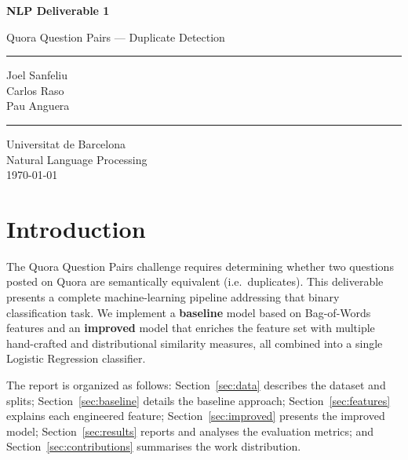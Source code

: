 \documentclass[11pt,a4paper]{article}
\begin{document}
\begin{titlepage}
    \centering
    \vspace*{2cm}
    {\LARGE\bfseries\color{accentblue} NLP Deliverable 1\par}
    \vspace{0.4cm}
    {\large Quora Question Pairs --- Duplicate Detection\par}
    \vspace{1.5cm}
    \rule{0.6\textwidth}{0.8pt}\par
    \vspace{1cm}
    {\large
        Joel Sanfeliu\\[4pt]
        Carlos Raso\\[4pt]
        Pau Anguera\par}
    \vspace{1cm}
    \rule{0.6\textwidth}{0.8pt}\par
    \vspace{1.5cm}
    {\normalsize Universitat de Barcelona\\
    Natural Language Processing\\
    \today\par}
    \vfill
\end{titlepage}

\tableofcontents
\newpage

\section{Introduction}

The Quora Question Pairs challenge requires determining whether two questions posted on Quora are semantically equivalent (i.e.\ duplicates). This deliverable presents a complete machine-learning pipeline addressing that binary classification task. We implement a \textbf{baseline} model based on Bag-of-Words features and an \textbf{improved} model that enriches the feature set with multiple hand-crafted and distributional similarity measures, all combined into a single Logistic Regression classifier.

The report is organized as follows: Section~\ref{sec:data} describes the dataset and splits; Section~\ref{sec:baseline} details the baseline approach; Section~\ref{sec:features} explains each engineered feature; Section~\ref{sec:improved} presents the improved model; Section~\ref{sec:results} reports and analyses the evaluation metrics; and Section~\ref{sec:contributions} summarises the work distribution.
\end{document}
